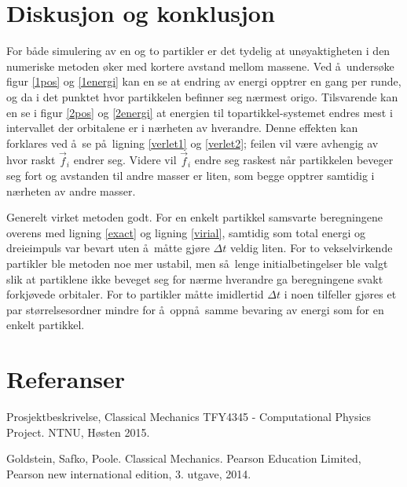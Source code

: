 \documentclass[5p]{elsarticle}        %
\begin{document}
\section{Diskusjon og konklusjon}

For b\aa de simulering av en og to partikler er det tydelig at un\o yaktigheten i den numeriske metoden \o ker med kortere avstand mellom massene. Ved \aa \ unders\o ke figur \ref{1pos} og \ref{1energi} kan en se at endring av energi opptrer en gang per runde, og da i det punktet hvor partikkelen befinner seg n\ae rmest origo. Tilsvarende kan en se i figur \ref{2pos} og \ref{2energi} at energien til topartikkel-systemet endres mest i intervallet der orbitalene er i n\ae rheten av hverandre. Denne effekten kan forklares ved \aa \ se p\aa \ ligning \eqref{verlet1} og \eqref{verlet2}; feilen vil v\ae re avhengig av hvor raskt $\vec{f}_i$ endrer seg. Videre vil $\vec{f}_i$ endre seg raskest n\aa r partikkelen beveger seg fort og avstanden til andre masser er liten, som begge opptrer samtidig i n\ae rheten av andre masser.

Generelt virket metoden godt. For en enkelt partikkel samsvarte beregningene overens med ligning \eqref{exact} og ligning \eqref{virial}, samtidig som total energi og dreieimpuls var bevart uten \aa \ m\aa tte gj\o re $\Delta t$ veldig liten. For to vekselvirkende partikler ble metoden noe mer ustabil, men s\aa \ lenge initialbetingelser ble valgt slik at partiklene ikke beveget seg for n\ae rme hverandre ga beregningene svakt forkj\o vede orbitaler. For to partikler m\aa tte imidlertid $\Delta t$ i noen tilfeller gj\o res et par st\o rrelsesordner mindre for \aa \ oppn\aa \ samme bevaring av energi som for en enkelt partikkel.

\section*{Referanser}

\begin{thebibliography}{99}

Prosjektbeskrivelse, Classical Mechanics TFY4345 - Computational Physics Project. NTNU, H\o sten 2015.

Goldstein, Safko, Poole. Classical Mechanics. Pearson Education Limited, Pearson new international edition, 3. utgave, 2014.

\end{thebibliography}


\end{document}
